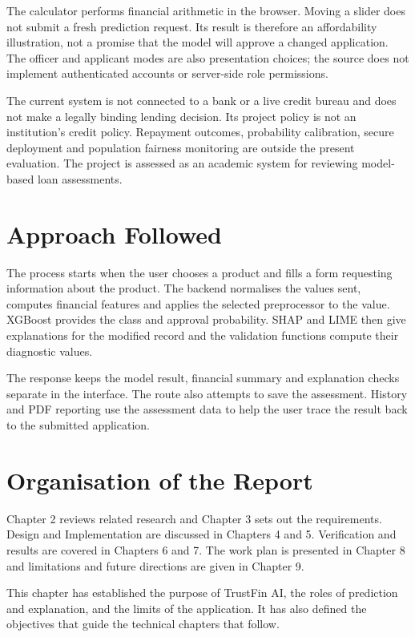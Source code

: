 The calculator performs financial arithmetic in the browser. Moving a slider does not submit a fresh prediction request. Its result is therefore an affordability illustration, not a promise that the model will approve a changed application. The officer and applicant modes are also presentation choices; the source does not implement authenticated accounts or server-side role permissions.

The current system is not connected to a bank or a live credit bureau and does not make a legally binding lending decision. Its project policy is not an institution's credit policy. Repayment outcomes, probability calibration, secure deployment and population fairness monitoring are outside the present evaluation. The project is assessed as an academic system for reviewing model-based loan assessments.

\section{Approach Followed}
The process starts when the user chooses a product and fills a form requesting information about the product. The backend normalises the values sent, computes financial features and applies the selected preprocessor to the value. XGBoost provides the class and approval probability. SHAP and LIME then give explanations for the modified record and the validation functions compute their diagnostic values.

The response keeps the model result, financial summary and explanation checks separate in the interface. The route also attempts to save the assessment. History and PDF reporting use the assessment data to help the user trace the result back to the submitted application.

\section{Organisation of the Report}
Chapter 2 reviews related research and Chapter 3 sets out the requirements. Design and Implementation are discussed in Chapters 4 and 5. Verification and results are covered in Chapters 6 and 7. The work plan is presented in Chapter 8 and limitations and future directions are given in Chapter 9.

\par\medskip\noindent
This chapter has established the purpose of TrustFin AI, the roles of prediction and explanation, and the limits of the application. It has also defined the objectives that guide the technical chapters that follow.
